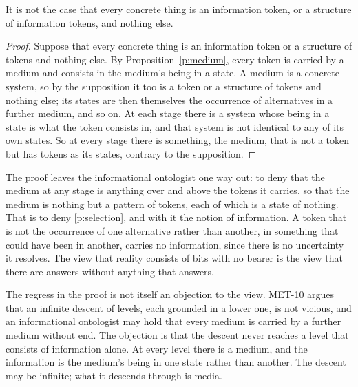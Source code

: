 \documentclass{situationist-preprint}
\begin{document}
\begin{theorem}\label{t:main}
It is not the case that every concrete thing is an information token, or a structure of information tokens, and nothing else.
\end{theorem}

\begin{proof}
Suppose that every concrete thing is an information token or a structure of tokens and nothing else. By Proposition~\ref{p:medium}, every token is carried by a medium and consists in the medium's being in a state. A medium is a concrete system, so by the supposition it too is a token or a structure of tokens and nothing else; its states are then themselves the occurrence of alternatives in a further medium, and so on. At each stage there is a system whose being in a state is what the token consists in, and that system is not identical to any of its own states. So at every stage there is something, the medium, that is not a token but has tokens as its states, contrary to the supposition.
\end{proof}

The proof leaves the informational ontologist one way out: to deny that the medium at any stage is anything over and above the tokens it carries, so that the medium is nothing but a pattern of tokens, each of which is a state of nothing. That is to deny \ref{p:selection}, and with it the notion of information. A token that is not the occurrence of one alternative rather than another, in something that could have been in another, carries no information, since there is no uncertainty it resolves. The view that reality consists of bits with no bearer is the view that there are answers without anything that answers.

The regress in the proof is not itself an objection to the view. MET-10 argues that an infinite descent of levels, each grounded in a lower one, is not vicious, and an informational ontologist may hold that every medium is carried by a further medium without end. The objection is that the descent never reaches a level that consists of information alone. At every level there is a medium, and the information is the medium's being in one state rather than another. The descent may be infinite; what it descends through is media.
\end{document}
